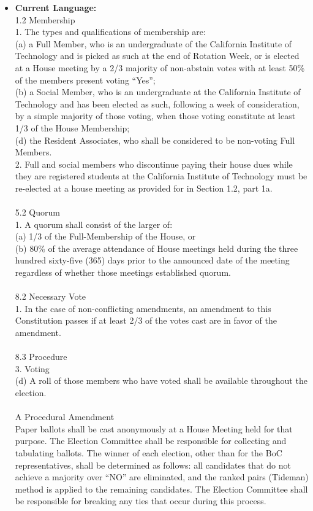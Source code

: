 \documentclass[10pt]{article} %
\begin{document}
\begin{itemize}
    \item \textbf{Current Language:} \\
        1.2 Membership \\
        1. The types and qualifications of membership are: \\
        (a) a Full Member, who is an undergraduate of the California Institute of Technology and is picked as such at the end of Rotation Week, or is elected at a House meeting by a 2/3 majority of non-abstain votes with at least 50\% of the members present voting ``Yes''; \\
        (b) a Social Member, who is an undergraduate at the California Institute of Technology and has been elected as such, following a week of consideration, by a simple majority of those voting, when those voting constitute at least 1/3 of the House Membership; \\
        (d) the Resident Associates, who shall be considered to be non-voting Full Members. \\
        2. Full and social members who discontinue paying their house dues while they are registered students at the California Institute of Technology must be re-elected at a house meeting as provided for in Section 1.2, part 1a. \\ \\
        5.2 Quorum \\
        1. A quorum shall consist of the larger of: \\
        (a) 1/3 of the Full-Membership of the House, or \\
        (b) 80\% of the average attendance of House meetings held during the three hundred sixty-five (365) days prior to the announced date of the meeting regardless of whether those meetings established quorum. \\ \\
        8.2 Necessary Vote \\
        1. In the case of non-conflicting amendments, an amendment to this Constitution passes if at least 2/3 of the votes cast are in favor of the amendment. \\ \\
        8.3 Procedure \\
        3. Voting \\
        (d) A roll of those members who have voted shall be available throughout the election. \\ \\
        A Procedural Amendment \\
        Paper ballots shall be cast anonymously at a House Meeting held for that purpose. The Election Committee shall be responsible for collecting and tabulating ballots. The winner of each election, other than for the BoC representatives, shall be determined as follows: all candidates that do not achieve a majority over “NO” are eliminated, and the ranked pairs (Tideman) method is applied to the remaining candidates. The Election Committee shall be responsible for breaking any ties that occur during this process.


\end{itemize}
\end{document}
